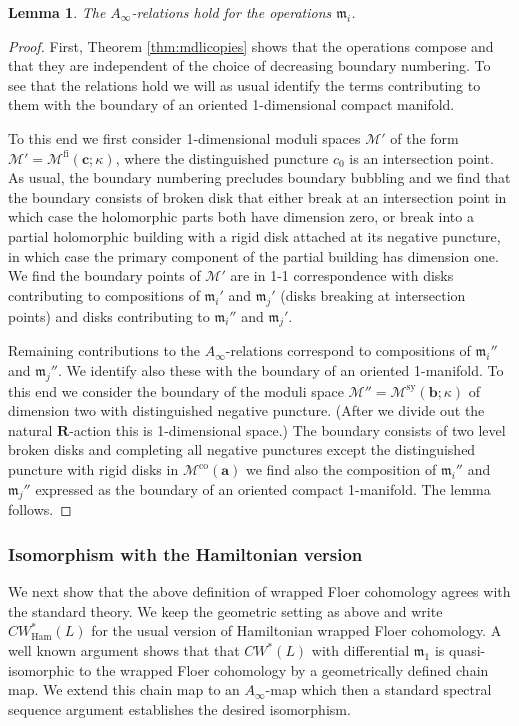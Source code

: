 \documentclass{gtpart}
\newtheorem{lem}[thm]{Lemma}
\newcommand{\m}{\mathfrak{m}}
\renewcommand{\R}{\mathbf{R}}
\renewcommand{\co}{\mathrm{co}}
\newcommand{\fl}{\mathrm{fi}}
\newcommand{\sy}{\mathrm{sy}}
\begin{document}
\begin{lem}
The $A_{\infty}$-relations hold for the operations $\m_i$.
\end{lem}
\begin{proof}
First, Theorem \ref{thm:mdlicopies} shows that the operations compose and that they are independent of the choice of decreasing boundary numbering. To see that the relations hold we will as usual identify the terms contributing to them with the boundary of an oriented 1-dimensional compact manifold. 

To this end we first consider 1-dimensional moduli spaces $\mathcal{M}'$ of the form    	
$\mathcal{M}'=\mathcal{M}^{\fl}(\mathbf{c};\kappa)$, where the distinguished puncture $c_{0}$ is an intersection point. As usual, the boundary numbering precludes boundary bubbling and we find that the boundary consists of broken disk that either break at an intersection point in which case the holomorphic parts both have dimension zero, or break into a partial holomorphic building with a rigid disk attached at its negative puncture, in which case the primary component of the partial building has dimension one. We find the boundary points of $\mathcal{M}'$ are in 1-1 correspondence with disks contributing to compositions of $\m_{i}'$ and $\m_{j}'$ (disks breaking at intersection points) and
disks contributing to $\m_{i}''$ and $\m_{j}'$. 

Remaining contributions to the $A_{\infty}$-relations correspond to compositions of $\m_{i}''$ and $\m_{j}''$. We identify also these with the boundary of an oriented 1-manifold. To this end we consider the boundary of the moduli space $\mathcal{M}''=\mathcal{M}^{\sy}(\mathbf{b};\kappa)$ of dimension two with distinguished negative puncture. (After we divide out the natural $\R$-action this is 1-dimensional space.) The boundary consists of two level broken disks and completing all negative punctures except the distinguished puncture with rigid disks in $\mathcal{M}^{\co}(\mathbf{a})$ we find also the composition of $\m_{i}''$ and $\m_{j}''$ expressed as the boundary of an oriented compact 1-manifold. The lemma follows.
\end{proof}

\subsubsection{Isomorphism with the Hamiltonian version}\label{sec:wrappediso}
We next show that the above definition of wrapped Floer cohomology agrees with the standard theory.
We keep the geometric setting as above and write $CW^{\ast}_{\mathrm{Ham}}(L)$ for the usual version
of Hamiltonian wrapped Floer cohomology. A well known argument \cite{EKH} shows that that
$CW^{\ast}(L)$ with differential $\m_{1}$ is quasi-isomorphic to the wrapped Floer cohomology by a
geometrically defined chain map. We extend this chain map to an $A_{\infty}$-map which then a standard spectral sequence argument establishes the desired isomorphism. 
\end{document}
